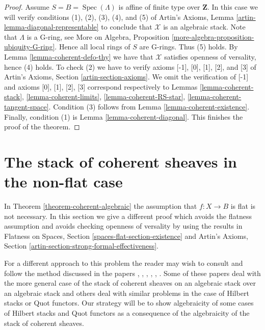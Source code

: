 \documentclass{stacks-project}
\theoremstyle{plain}
\theoremstyle{definition}
\theoremstyle{remark}
\numberwithin{equation}{subsection}
\def\Spec{\mathop{\mathrm{Spec}}}
\begin{document}
\begin{proof}
\medskip\noindent
Assume $S = B = \Spec(\Lambda)$ is affine of finite type over $\mathbf{Z}$.
In this case we will verify conditions (1), (2), (3), (4), and (5) of
Artin's Axioms, Lemma \ref{artin-lemma-diagonal-representable}
to conclude that $\mathcal{X}$ is an algebraic stack.
Note that $\Lambda$ is a G-ring, see
More on Algebra, Proposition \ref{more-algebra-proposition-ubiquity-G-ring}.
Hence all local rings of $S$ are G-rings. Thus (5) holds.
By Lemma \ref{lemma-coherent-defo-thy}
we have that $\mathcal{X}$ satisfies openness of versality, hence (4) holds.
To check (2) we have to verify axioms [-1], [0], [1], [2], and [3]
of Artin's Axioms, Section \ref{artin-section-axioms}.
We omit the verification of [-1] and axioms
[0], [1], [2], [3] correspond respectively to
Lemmas \ref{lemma-coherent-stack},
\ref{lemma-coherent-limits},
\ref{lemma-coherent-RS-star},
\ref{lemma-coherent-tangent-space}.
Condition (3) follows from Lemma \ref{lemma-coherent-existence}.
Finally, condition (1) is Lemma \ref{lemma-coherent-diagonal}.
This finishes the proof of the theorem.
\end{proof}








\section{The stack of coherent sheaves in the non-flat case}
\label{section-not-flat}

\noindent
In Theorem \ref{theorem-coherent-algebraic} the assumption that $f : X \to B$
is flat is not necessary. In this section we give a different proof
which avoids the flatness assumption and avoids checking openness
of versality by using the results
in Flatness on Spaces, Section \ref{spaces-flat-section-existence} and
Artin's Axioms, Section \ref{artin-section-strong-formal-effectiveness}.

\medskip\noindent
For a different approach to this problem the reader may wish to consult
\cite{ArtinI} and follow the method discussed in the papers
\cite{olsson-starr}, \cite{lieblich_remarks}, \cite{olsson_proper},
\cite{Hall-Rydh}, \cite{Hall-Rydh-Hilbert}, \cite{rydh_representability}.
Some of these papers deal with the more general case of the stack of
coherent sheaves on an algebraic stack over an algebraic stack and
others deal with similar problems in the case of Hilbert stacks
or Quot functors. Our strategy will be to show algebraicity of some
cases of Hilbert stacks and Quot functors as a consequence of the
algebraicity of the stack of coherent sheaves.
\end{document}
